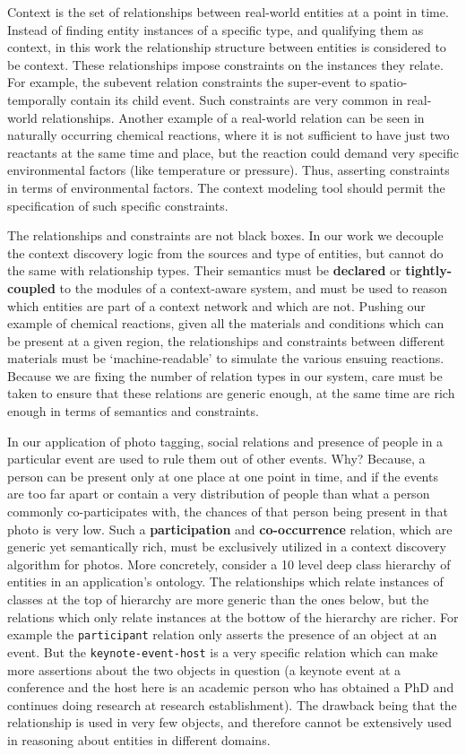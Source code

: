 Context is the set of relationships between real-world entities at a point in time. Instead of finding entity instances of a specific type, and qualifying them as context, in this work the relationship structure between entities is considered to be  context. These relationships impose constraints on the instances they relate. For example, the subevent relation constraints the super-event to spatio-temporally contain its child event. Such constraints are very common in real-world relationships. Another example of a real-world relation can be seen in naturally occurring chemical reactions, where it is not sufficient to have just two reactants at the same time and place, but the reaction could demand very specific environmental factors (like temperature or pressure). Thus, asserting constraints in terms of environmental factors. The context modeling tool should permit the specification of such specific constraints.

The relationships and constraints are not black boxes. In our work we decouple the context discovery logic from the sources and type of entities, but cannot do the same with relationship types. Their semantics must be \textbf{declared} or \textbf{tightly-coupled} to the modules of a context-aware system, and must be used to reason which entities are part of a context network and which are not. Pushing our example of chemical reactions, given all the materials and conditions which can be present at a given region, the relationships and constraints between different materials must be `machine-readable' to simulate the various ensuing reactions. Because we are fixing the number of relation types in our system, care must be taken to ensure that these relations are generic enough, at the same time are rich enough in terms of semantics and constraints.

In our application of photo tagging, social relations and presence of people in a particular event are used to rule them out of other events. Why? Because, a person can be present only at one place at one point in time, and if the events are too far apart or contain a very distribution of people than what a person commonly co-participates with, the chances of that person being present in that photo is very low. Such a \textbf{participation} and \textbf{co-occurrence} relation, which are generic yet semantically rich, must be exclusively utilized in a context discovery algorithm for photos. More concretely, consider a 10 level deep class hierarchy of entities in an application's ontology. The relationships which relate instances of classes at the top of hierarchy are more generic than the ones below, but the relations which only relate instances at the bottow of the hierarchy are richer. For example the \texttt{participant} relation only asserts the presence of an object at an event. But the \texttt{keynote-event-host} is a very specific relation which can make more assertions about the two objects in question (a keynote event at a conference and the host here is an academic person who has obtained a PhD and continues doing research at research establishment). The drawback being that the relationship is used in very few objects, and therefore cannot be extensively used in reasoning about entities in different domains.

